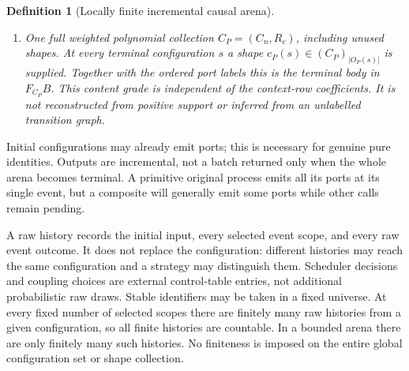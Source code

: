 \documentclass[11pt]{article}
\newtheorem{definition}{Definition}\newtheorem{theorem}[definition]{Theorem}\newtheorem{proposition}[definition]{Proposition}
\begin{document}
\begin{definition}[Locally finite incremental causal arena]
\begin{enumerate}
\item One full weighted polynomial collection $C_P=(C_n,R_c)$, including unused shapes. At every terminal configuration $s$ a shape $c_P(s)\in(C_P)_{|O_P(s)|}$ is supplied. Together with the ordered port labels this is the terminal body in $F_{C_P}B$. This content grade is independent of the context-row coefficients. It is not reconstructed from positive support or inferred from an unlabelled transition graph.
\end{enumerate}
\end{definition}
Initial configurations may already emit ports; this is necessary for genuine pure identities. Outputs are incremental, not a batch returned only when the whole arena becomes terminal. A primitive original process emits all its ports at its single event, but a composite will generally emit some ports while other calls remain pending.

A raw history records the initial input, every selected event scope, and every raw event outcome. It does not replace the configuration: different histories may reach the same configuration and a strategy may distinguish them. Scheduler decisions and coupling choices are external control-table entries, not additional probabilistic raw draws. Stable identifiers may be taken in a fixed universe. At every fixed number of selected scopes there are finitely many raw histories from a given configuration, so all finite histories are countable. In a bounded arena there are only finitely many such histories. No finiteness is imposed on the entire global configuration set or shape collection.
\end{document}
